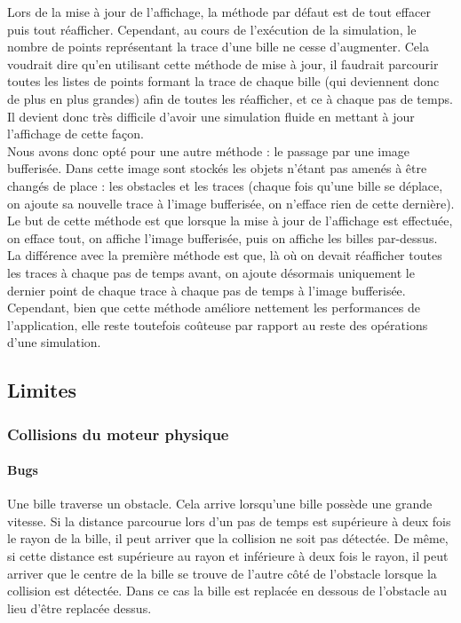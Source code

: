 \documentclass{report}
\begin{document}
Lors de la mise à jour de l’affichage, la méthode par défaut est de tout effacer puis tout réafficher. Cependant, au cours de l’exécution de la simulation, le nombre de points représentant la trace d’une bille ne cesse d’augmenter. Cela voudrait dire qu’en utilisant cette méthode de mise à jour, il faudrait parcourir toutes les listes de points formant la trace de chaque bille (qui deviennent donc de plus en plus grandes) afin de toutes les réafficher, et ce à chaque pas de temps. Il devient donc très difficile d’avoir une simulation fluide en mettant à jour l’affichage de cette façon. \\

Nous avons donc opté pour une autre méthode : le passage par une image bufferisée. Dans cette image sont stockés les objets n’étant pas amenés à être changés de place : les obstacles et les traces (chaque fois qu’une bille se déplace, on ajoute sa nouvelle trace à l’image bufferisée, on n’efface rien de cette dernière). \\

Le but de cette méthode est que lorsque la mise à jour de l’affichage est effectuée, on efface tout, on affiche l’image bufferisée, puis on affiche les billes par-dessus. La différence avec la première méthode est que, là où on devait réafficher toutes les traces à chaque pas de temps avant, on ajoute désormais uniquement le dernier point de chaque trace à chaque pas de temps à l’image bufferisée. \\

Cependant, bien que cette méthode améliore nettement les performances de l’application, elle reste toutefois coûteuse par rapport au reste des opérations d’une simulation.

\newpage
\subsection{Limites}

\subsubsection{Collisions du moteur physique}

\paragraph{Bugs}

Une bille traverse un obstacle. Cela arrive lorsqu’une bille possède une grande vitesse. Si la distance parcourue lors d’un pas de temps est supérieure à deux fois le rayon de la bille, il peut arriver que la collision ne soit pas détectée. De même, si cette distance est supérieure au rayon et inférieure à deux fois le rayon, il peut arriver que le centre de la bille se trouve de l’autre côté de l’obstacle lorsque la collision est détectée. Dans ce cas la bille est replacée en dessous de l’obstacle au lieu d’être replacée dessus.
\end{document}
